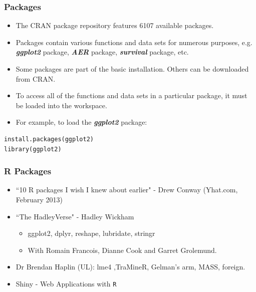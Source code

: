 \documentclass{beamer}
\begin{document}
\begin{frame}[fragile]
	
\frametitle{Packages}
\begin{itemize}
\item The CRAN package repository features 6107 available packages. 
\item Packages contain
various functions and data sets for numerous purposes, e.g.
\textbf{\textit{ggplot2}} package, \textbf{\textit{AER}} package, \textbf{\textit{survival}} package, etc.
\item Some packages are part of the basic installation. Others can be
downloaded from CRAN.
\item To access all of the functions and data sets in a particular package,
it must be loaded into the workspace. 
\item For example, to load the
\textbf{\textit{ggplot2}} package:
\end{itemize}
\begin{framed}
\begin{verbatim}
install.packages(ggplot2)
library(ggplot2)
\end{verbatim}
\end{framed}
\end{frame}
\begin{frame}	
\frametitle{R Packages}

\begin{itemize}
\item ``10 R packages I wish I knew about earlier" - Drew Conway (Yhat.com, February 2013)
\bigskip \item ``The HadleyVerse" - Hadley Wickham
\begin{itemize}
	
	\item  ggplot2, dplyr, reshape, lubridate, stringr
	
	\item  With Romain Francois, Dianne Cook and Garret Grolemund.
\end{itemize}
\bigskip
\item Dr Brendan Haplin (UL): lme4 ,TraMineR, Gelman's arm, MASS, foreign. 
\bigskip
\item Shiny - Web Applications with \texttt{R}
\end{itemize}
\end{frame}
\end{document}
